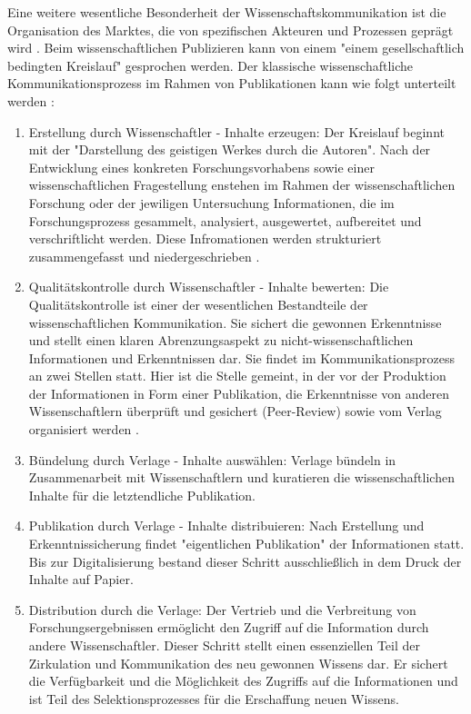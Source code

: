 Eine weitere wesentliche Besonderheit der Wissenschaftskommunikation ist die Organisation des Marktes, die von spezifischen Akteuren und Prozessen geprägt wird \cite{Hess_2006}. Beim wissenschaftlichen Publizieren kann von einem "einem gesellschaftlich bedingten Kreislauf" \cite{schirmbacher_2009_wisspub} gesprochen werden. Der klassische wissenschaftliche Kommunikationsprozess im Rahmen von Publikationen kann wie folgt unterteilt werden\cite{cite:11b} \cite{Hess_2006}:
\begin{enumerate}
\item Erstellung durch Wissenschaftler - Inhalte erzeugen: 
Der Kreislauf beginnt mit der "Darstellung des geistigen Werkes durch die Autoren"\cite{schirmbacher_2009_wisspub}. Nach der Entwicklung eines konkreten Forschungsvorhabens sowie einer wissenschaftlichen Fragestellung enstehen im Rahmen der wissenschaftlichen Forschung oder der jewiligen Untersuchung Informationen\cite{cite:11c}, die im Forschungsprozess gesammelt, analysiert, ausgewertet, aufbereitet und verschriftlicht werden\cite{cite:11d}. Diese Infromationen werden strukturiert zusammengefasst und niedergeschrieben \cite{Hess_2006}.
\item Qualitätskontrolle durch Wissenschaftler - Inhalte bewerten: 
Die Qualitätskontrolle ist einer der wesentlichen Bestandteile der wissenschaftlichen Kommunikation. Sie sichert die gewonnen Erkenntnisse\cite{cite:11e} und stellt einen klaren Abrenzungsaspekt zu nicht-wissenschaftlichen Informationen und Erkenntnissen dar\cite{cite:11f}. Sie findet im Kommunikationsprozess an zwei Stellen statt. Hier ist die Stelle gemeint, in der vor der Produktion der Informationen in Form einer Publikation, die Erkenntnisse von anderen Wissenschaftlern überprüft und gesichert (Peer-Review) \cite{Hess_2006} sowie vom Verlag organisiert werden \cite{schirmbacher_2009_wisspub}.
\item Bündelung durch Verlage - Inhalte auswählen:
Verlage bündeln in Zusammenarbeit mit Wissenschaftlern und kuratieren die wissenschaftlichen Inhalte für die letztendliche Publikation. 
\item Publikation durch Verlage - Inhalte distribuieren: 
Nach Erstellung und Erkenntnissicherung findet "eigentlichen Publikation" \cite{schirmbacher_2009_wisspub} der Informationen statt. Bis zur Digitalisierung bestand dieser Schritt ausschließlich in dem Druck der Inhalte auf Papier.\cite{cite:11h}
\item Distribution durch die Verlage: 
Der Vertrieb und die Verbreitung von Forschungsergebnissen ermöglicht den Zugriff auf die Information durch andere Wissenschaftler. Dieser Schritt stellt einen essenziellen Teil der Zirkulation und Kommunikation des neu gewonnen Wissens dar\cite{cite:11i}. Er sichert die Verfügbarkeit und die Möglichkeit des Zugriffs auf die Informationen und ist Teil des Selektionsprozesses für die Erschaffung neuen Wissens.\cite{cite:11l}

\end{enumerate}
